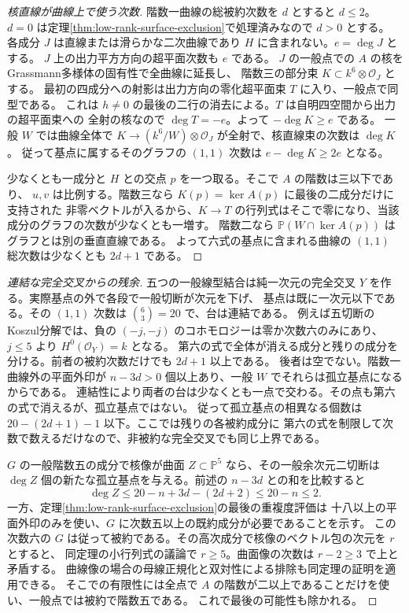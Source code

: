 \begin{proof}[核直線が曲線上で使う次数]
階数一曲線の総被約次数を $d$ とすると $d\le2$。
$d=0$ は定理\ref{thm:low-rank-surface-exclusion}で処理済みなので $d>0$ とする。
各成分 $J$ は直線または滑らかな二次曲線であり $H$ に含まれない。$e=\deg J$ とする。
$J$ 上の出力平方方向の超平面次数も $e$ である。
$J$ の一般点での $A$ の核をGrassmann多様体の固有性で全曲線に延長し、
階数三の部分束 $K\subset k^6\otimes\mathcal O_J$ とする。
最初の四成分への射影は出力方向の零化超平面束 $T$ に入り、一般点で同型である。
これは $h\ne0$ の最後の二行の消去による。$T$ は自明四空間から出力の超平面束への
全射の核なので $\deg T=-e$。よって $-\deg K\ge e$ である。
一般 $W$ では曲線全体で $K\to(k^6/W)\otimes\mathcal O_J$ が全射で、核直線束の次数は $\deg K$。
従って基点に属するそのグラフの $(1,1)$ 次数は $e-\deg K\ge2e$ となる。

少なくとも一成分と $H$ との交点 $p$ を一つ取る。そこで $A$ の階数は三以下であり、
$u,v$ は比例する。階数三なら $K(p)=\ker A(p)$ に最後の二成分だけに支持された
非零ベクトルが入るから、$K\to T$ の行列式はそこで零になり、当該成分のグラフの次数が少なくとも一増す。
階数二なら $\mathbb P(W\cap\ker A(p))$ はグラフとは別の垂直直線である。
よって六式の基点に含まれる曲線の $(1,1)$ 総次数は少なくとも $2d+1$ である。
\end{proof}
\begin{proof}[連結な完全交叉からの残余]
五つの一般線型結合は純一次元の完全交叉 $Y$ を作る。実際基点の外で各段で一般切断が次元を下げ、
基点は既に一次元以下である。その $(1,1)$ 次数は $\binom63=20$ で、台は連結である。
例えば五切断のKoszul分解では、負の $( -j,-j)$ のコホモロジーは零か次数六のみにあり、
$j\le5$ より $H^0(\mathcal O_Y)=k$ となる。
第六の式で全体が消える成分と残りの成分を分ける。前者の被約次数だけでも $2d+1$ 以上である。
後者は空でない。階数一曲線外の平面外印が $n-3d>0$ 個以上あり、一般 $W$ でそれらは孤立基点になるからである。
連結性により両者の台は少なくとも一点で交わる。その点も第六の式で消えるが、孤立基点ではない。
従って孤立基点の相異なる個数は $20-(2d+1)-1$ 以下。ここでは残りの各被約成分に
第六の式を制限して次数で数えるだけなので、非被約な完全交叉でも同じ上界である。

$G$ の一般階数五の成分で核像が曲面 $Z\subset\mathbb P^5$ なら、その一般余次元二切断は
$\deg Z$ 個の新たな孤立基点を与える。前述の $n-3d$ との和を比較すると
\[
                 \deg Z\le 20-n+3d-(2d+2)\le20-n\le2 .
\]
一方、定理\ref{thm:low-rank-surface-exclusion}の最後の重複度評価は
十八以上の平面外印のみを使い、$G$ に次数五以上の既約成分が必要であることを示す。
この次数六の $G$ は従って被約である。その高次成分で核像のベクトル包の次元を $r$ とすると、
同定理の小行列式の議論で $r\ge5$。曲面像の次数は $r-2\ge3$ で上と矛盾する。
曲線像の場合の母線正規化と双対性による排除も同定理の証明を適用できる。
そこでの有限性には全点で $A$ の階数が二以上であることだけを使い、一般点では被約で階数五である。
これで最後の可能性も除かれる。
\end{proof}
